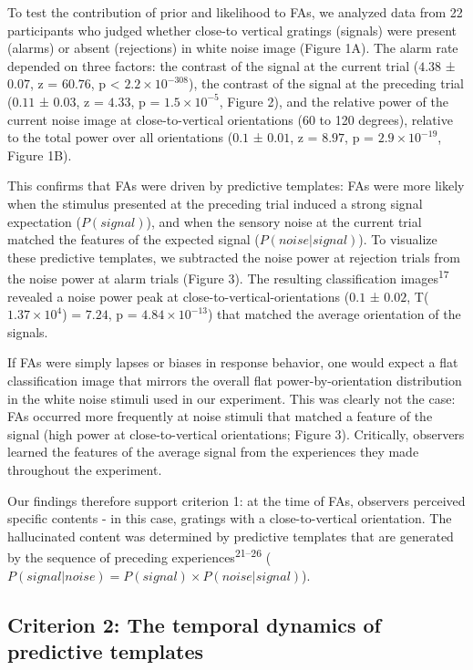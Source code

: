 \documentclass[
]{article}
\begin{document}
To test the contribution of prior and likelihood to FAs, we analyzed
data from 22 participants who judged whether close-to vertical gratings
(signals) were present (alarms) or absent (rejections) in white noise
image (Figure 1A). The alarm rate depended on three factors: the
contrast of the signal at the current trial (\(4.38\) ± \(0.07\), z =
\(60.76\), p < \(\ensuremath{2.2\times 10^{-308}}\)), the contrast of the signal at the preceding trial
(\(0.11\) ± \(0.03\), z = \(4.33\), p =
\(\ensuremath{1.5\times 10^{-5}}\), Figure 2), and the relative power of
the current noise image at close-to-vertical orientations (60 to 120
degrees), relative to the total power over all orientations (\(0.1\) ±
\(0.01\), z = \(8.97\), p = \(\ensuremath{2.9\times 10^{-19}}\), Figure
1B).

This confirms that FAs were driven by predictive templates: FAs were
more likely when the stimulus presented at the preceding trial induced a
strong signal expectation (\(P(signal)\)), and when the sensory noise at
the current trial matched the features of the expected signal
(\(P(noise|signal)\)). To visualize these predictive templates, we
subtracted the noise power at rejection trials from the noise power at
alarm trials (Figure 3). The resulting classification
images\textsuperscript{17} revealed a noise power peak at
close-to-vertical-orientations (\(0.1\) ± \(0.02\),
T(\(\ensuremath{1.37\times 10^{4}}\)) = \(7.24\), p =
\(\ensuremath{4.84\times 10^{-13}}\)) that matched the average
orientation of the signals.

If FAs were simply lapses or biases in response behavior, one would
expect a flat classification image that mirrors the overall flat
power-by-orientation distribution in the white noise stimuli used in our
experiment. This was clearly not the case: FAs occurred more frequently
at noise stimuli that matched a feature of the signal (high power at
close-to-vertical orientations; Figure 3). Critically, observers learned
the features of the average signal from the experiences they made
throughout the experiment.

Our findings therefore support criterion 1: at the time of FAs,
observers perceived specific contents - in this case, gratings with a
close-to-vertical orientation. The hallucinated content was determined
by predictive templates that are generated by the sequence of preceding
experiences\textsuperscript{21--26}
(\(P(signal|noise) = P(signal) \times P(noise|signal)\)).

\hypertarget{criterion-2-the-temporal-dynamics-of-predictive-templates}{%
\subsection{Criterion 2: The temporal dynamics of predictive
templates}\label{criterion-2-the-temporal-dynamics-of-predictive-templates}}
\end{document}
